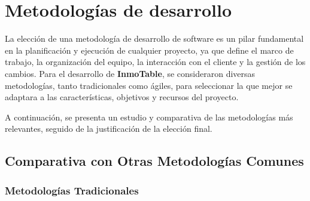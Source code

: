 \section{Metodologías de desarrollo}


La elección de una metodología de desarrollo de software es un pilar fundamental en la planificación y ejecución de cualquier proyecto, ya que define el marco de trabajo, la organización del equipo, la interacción con el cliente y la gestión de los cambios. Para el desarrollo de \textbf{InmoTable}, se consideraron diversas metodologías, tanto tradicionales como ágiles, para seleccionar la que mejor se adaptara a las características, objetivos y recursos del proyecto.

A continuación, se presenta un estudio y comparativa de las metodologías más relevantes, seguido de la justificación de la elección final.

\subsection{Comparativa con Otras Metodologías Comunes}

\subsubsection{Metodologías Tradicionales}

